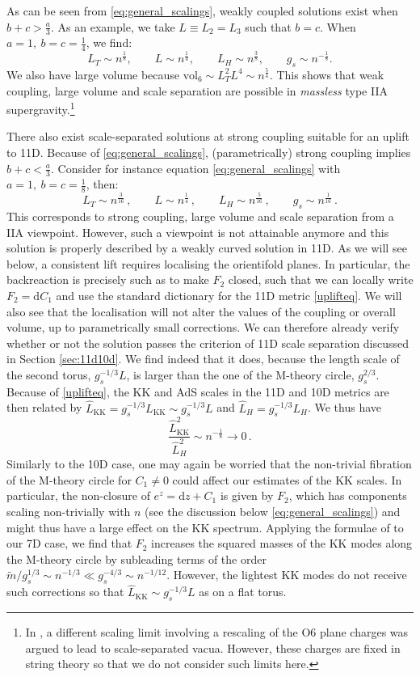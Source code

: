 \documentclass[11pt]{article}
\newcommand{\be}{\begin{equation}}
\newcommand{\ee}{\end{equation}}
\def\be{\begin{equation}}
\def\ee{\end{equation}}
\renewcommand{\[}{\left[}
\renewcommand{\]}{\right]}
\renewcommand{\(}{\left(}
\renewcommand{\)}{\right)}
\newcommand{\vol}{\text{vol}}
\renewcommand{\d}{\textrm{d}}
\newcommand{\<}{\langle}
\renewcommand{\>}{\rangle}
\begin{document}
As can be seen from \eqref{eq:general_scalings}, weakly coupled solutions exist when $b+c > \frac{a}{3}$. As an example, we take $L\equiv L_2=L_3$ such that $b=c$. When $a = 1,~b=c=\frac{1}{4}$, we find: 
\be
     L_T \sim n^{\frac{1}{8}}, \qquad L \sim n^{\frac{1}{4}}, 
     \qquad L_H \sim n^{\frac{3}{8}}, \qquad g_s\sim n^{-\frac{1}{8}}.
\ee
We also have large volume because $\vol_6 \sim L_T^2 L^4 \sim n^{\frac{5}{4}}$. This shows that weak coupling, large volume and scale separation are  possible in \emph{massless} type IIA supergravity.\footnote{In \cite{Caviezel:2008ik}, a different scaling limit involving a rescaling of the O6 plane charges was argued to lead to scale-separated vacua. However, these charges are fixed in string theory so that we do not consider such limits here.}

There also exist scale-separated solutions at strong coupling suitable for an uplift to 11D. Because of \eqref{eq:general_scalings}, (parametrically) strong coupling implies $b+c < \frac{a}{3}$.  Consider for instance equation \eqref{eq:general_scalings} with $a = 1,~b = c = \frac{1}{8}$, then:
\be
L_T \sim n^{\frac{3}{16}}\,,\qquad L \sim n^{\frac{1}{4}}\,,\qquad L_H \sim n^{\frac{5}{16}}\,,\qquad g_s \sim n^{\frac{1}{16}}\,.
\ee
This corresponds to strong coupling, large volume and scale separation from a IIA viewpoint. However, such a viewpoint is not attainable anymore and this solution is properly described by a weakly curved solution in 11D. As we will see below, a consistent lift requires localising the orientifold planes. In particular, the backreaction is precisely such as to make $F_2$ closed, such that we can locally write $F_2=\d C_1$ and use the standard dictionary for the 11D metric \eqref{uplifteq}. We will also see that the localisation will not alter the values of the coupling or overall volume, up to parametrically small corrections. We can therefore already verify whether or not the solution passes the criterion of 11D scale separation discussed in Section \ref{sec:11d10d}. We find indeed that it does, because the length scale of the second torus, $g_s^{-1/3}L$, is larger than the one of the M-theory circle, $g_s^{2/3}$.
Because of \eqref{uplifteq}, the KK and AdS scales in the 11D and 10D metrics are then related by $\hat L_\text{KK} = g_s^{-1/3} L_\text{KK} \sim g_s^{-1/3} L$ and $\hat L_H = g_s^{-1/3}L_H$.
We thus have
\be\label{scalesep11D}
\frac{\hat L^2_\text{KK}}{\hat L^2_{H}}  \sim  n^{-\frac{1}{8}}\rightarrow 0\,.
\ee
Similarly to the 10D case, one may again be worried that the non-trivial fibration of the M-theory circle for $C_1\neq 0$ could affect our estimates of the KK scales.
In particular, the non-closure of $e^z=\d z+C_1$ is given by $F_2$, which has components scaling non-trivially with $n$ (see the discussion below \eqref{eq:general_scalings}) and might thus have a large effect on the KK spectrum. Applying the formulae of \cite{Andriot:2016rdd} to our 7D case, we find that $F_2$ increases the squared masses of the KK modes along the M-theory circle by subleading terms of the order $\tilde m/g_s^{1/3}\sim n^{-1/3}\ll g_s^{-4/3}\sim n^{-1/12}$. However, the lightest KK modes do not receive such corrections so that $\hat L_\text{KK}\sim g_s^{-1/3}L$ as on a flat torus.
\end{document}
